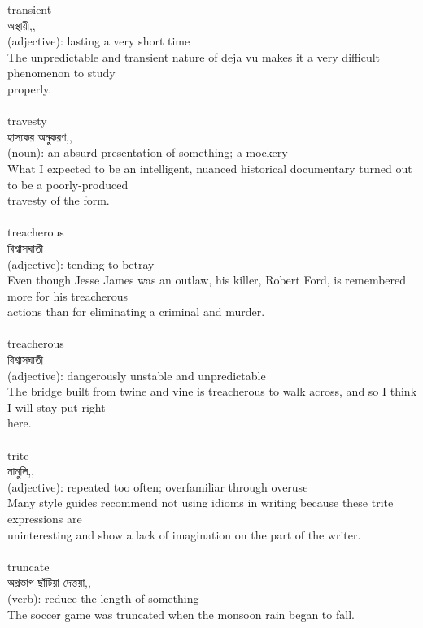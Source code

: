 \documentclass{article}
\begin{document}
{transient}\\
{অস্থায়ী,,}\\
{(adjective): lasting a very short time\\The unpredictable and transient nature of deja vu makes it a very difficult phenomenon to study\\properly.\\}\\
{travesty}\\
{হাস্যকর অনুকরণ,,}\\
{(noun): an absurd presentation of something; a mockery\\What I expected to be an intelligent, nuanced historical documentary turned out to be a poorly-produced\\travesty of the form.\\}\\
{treacherous}\\
{বিশ্বাসঘাতী}\\
{(adjective): tending to betray\\Even though Jesse James was an outlaw, his killer, Robert Ford, is remembered more for his treacherous\\actions than for eliminating a criminal and murder.\\}\\
{treacherous}\\
{বিশ্বাসঘাতী}\\
{(adjective): dangerously unstable and unpredictable\\The bridge built from twine and vine is treacherous to walk across, and so I think I will stay put right\\here.\\}\\
{trite}\\
{মামুলি,,}\\
{(adjective): repeated too often; overfamiliar through overuse\\Many style guides recommend not using idioms in writing because these trite expressions are\\uninteresting and show a lack of imagination on the part of the writer.\\}\\
{truncate}\\
{অগ্রভাগ ছাঁটিয়া দেত্তয়া,,}\\
{(verb): reduce the length of something\\The soccer game was truncated when the monsoon rain began to fall.\\}\\
\end{document}
